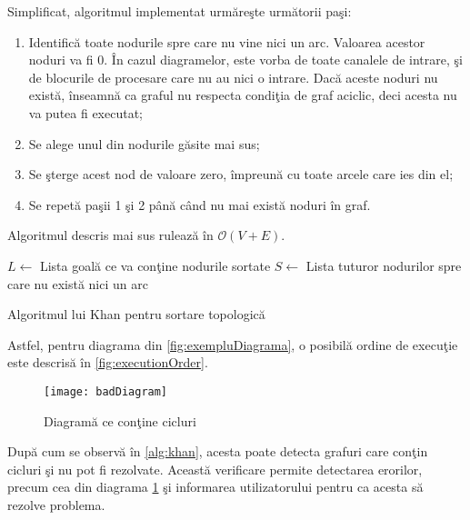 Simplificat, algoritmul implementat urmăreşte următorii paşi:
\begin{enumerate}
	\item Identifică toate nodurile spre care nu vine nici un arc. Valoarea acestor noduri va fi $0$. În cazul diagramelor, este vorba de toate canalele de intrare, şi de blocurile de procesare care nu au nici o intrare. Dacă aceste noduri nu există, înseamnă ca graful nu respecta condiţia de graf aciclic, deci acesta nu va putea fi executat;
	\item Se alege unul din nodurile găsite mai sus;
	\item Se şterge acest nod de valoare zero, împreună cu toate arcele care ies din el;
	\item Se repetă paşii 1 şi 2 până când nu mai există noduri în graf.
\end{enumerate}
Algoritmul descris mai sus rulează în $\mathcal{O}(V + E)$. 

\begin{algorithm}[H]
	$L \gets$ Lista goală ce va conţine nodurile sortate \;
	$S \gets$ Lista tuturor nodurilor spre care nu există nici un arc \;
{}{
	{}
}
\label{alg:khan}
\caption{Algoritmul lui Khan pentru sortare topologică}
\end{algorithm}

Astfel, pentru diagrama din \cref{fig:exempluDiagrama}, o posibilă ordine de execuţie este descrisă în \cref{fig:executionOrder}.
\begin{figure}[H]
	\centering
	\texttt{[image: badDiagram]}
	\caption{Diagramă ce conţine cicluri}
	\label{fig:badDiagram}
\end{figure}

După cum se observă în \cref{alg:khan}, acesta poate detecta grafuri care conţin cicluri şi nu pot fi rezolvate. Această verificare permite detectarea erorilor, precum cea din diagrama \ref{fig:badDiagram} şi informarea utilizatorului pentru ca acesta să rezolve problema.

